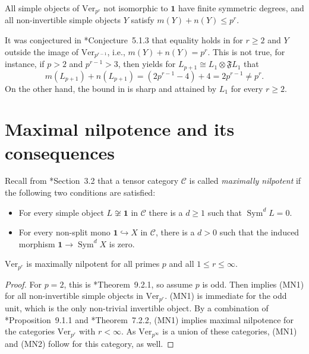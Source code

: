 \documentclass[11pt,oneside]{amsart}
\theoremstyle{definition}
\theoremstyle{remark}
\numberwithin{equation}{section}
\newcommand\cC{\mathcal C}
\newcommand\Ver{\mathrm{Ver}}
\newcommand\Sym{\operatorname{Sym}}
\renewcommand\o\otimes
\renewcommand\:\colon
\newcommand\one{\mathbf{1}}
\newcommand\Ffrak{\mathfrak F}
\begin{document}
\begin{corollary} \label{cor:bounds} All simple objects of $\Ver_{p^r}$ not isomorphic to $\one$ have finite symmetric degrees, and all non-invertible simple objects $Y$ satisfy $m(Y)+n(Y)\le p^r$.
\end{corollary}

\begin{remark} \label{rem:correction}
It was conjectured in \cite{CEN}*{Conjecture~5.1.3} that equality holds in  for $r\ge2$ and $Y$ outside the image of $\Ver_{p^{r-1}}$, i.e., $m(Y)+n(Y)=p^r$. This is not true, for instance, if $p>2$ and $p^{r-1}>3$, then  yields for $L_{p+1}\cong L_1\o \Ffrak L_1$ that
$$
m(L_{p+1}) + n(L_{p+1}) = (2p^{r-1} - 4) + 4 = 2p^{r-1} \neq p^r .
$$
On the other hand, the bound in  is sharp and attained by $L_1$ for every $r\ge2$.
\end{remark}

\section{Maximal nilpotence and its consequences}
\label{sec:MN}

Recall from \cite{Cou-commalg}*{Section~3.2} that a tensor category $\cC$ is called \emph{maximally nilpotent} if the following two conditions are satisfied:
\begin{itemize}
\item[\textbf{(MN1)}] For every simple object $L\not\cong\one$ in $\cC$ there is a $d\ge1$ such that $\Sym^d L=0$.
\item[\textbf{(MN2)}] For every non-split mono $\one\hookrightarrow X$ in $\cC$, there is a $d>0$ such that the induced morphism $\one\to\Sym^d X$ is zero.
\end{itemize}


\begin{proposition} \label{cor:MN}
$\Ver_{p^r}$ is maximally nilpotent for all primes $p$ and all $1\le r\le \infty$.
\end{proposition}

\begin{proof} For $p=2$, this is \cite{CEO-incompressible}*{Theorem~9.2.1}, so assume $p$ is odd. Then  implies (MN1) for all non-invertible simple objects in $\Ver_{p^r}$. (MN1) is immediate for the odd unit, which is the only non-trivial invertible object. By a combination of \cite{CEO-incompressible}*{Proposition~9.1.1} and \cite{CEO-incompressible}*{Theorem~7.2.2}, (MN1) implies maximal nilpotence for the categories $\Ver_{p^r}$ with $r<\infty$. As $\Ver_{p^\infty}$ is a union of these categories, (MN1) and (MN2) follow for this category, as well.
\end{proof}
\end{document}
